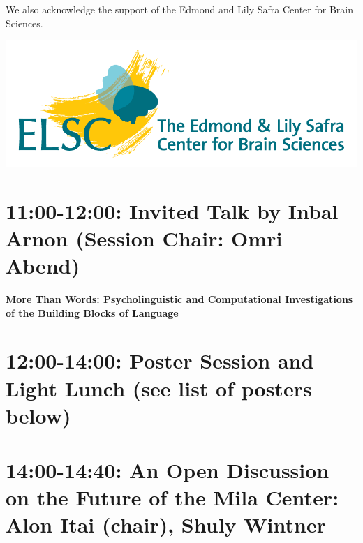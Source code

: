 \documentclass[a0,portrait]{a0poster}
\newcommand{\forceindent}{\leavevmode{\parindent=1em\indent}}
\begin{document}
\begin{minipage}{.2\textwidth}
        \vspace{1cm}

        \begin{flushleft}
            We also acknowledge the support of the Edmond and Lily Safra Center for Brain Sciences.
        \end{flushleft}
        \includegraphics[width=\textwidth]{elsc_logo.png}
    \end{minipage}

    \begin{minipage}{.95\textwidth}
        \LARGE

        \section*{11:00-12:00: Invited Talk by Inbal Arnon (Session Chair: Omri Abend)}
        \forceindent\LARGE\textbf{More Than Words: Psycholinguistic and Computational Investigations of the Building
        Blocks of Language}\\

        \section*{12:00-14:00: Poster Session and Light Lunch (see list of posters below)}

        \section*{14:00-14:40: An Open Discussion on the Future of the Mila Center:
        Alon Itai (chair), Shuly Wintner}
    \end{minipage}
\end{document}

